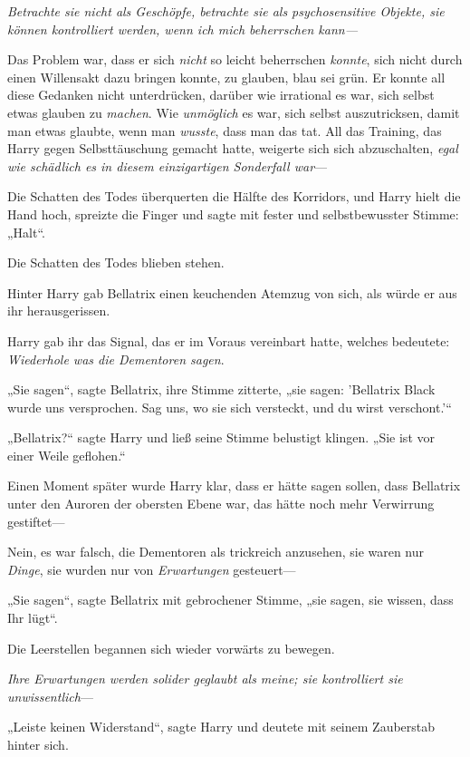 {\emph{Betrachte sie nicht als Geschöpfe, betrachte sie als psychosensitive Objekte, sie können kontrolliert werden, wenn ich mich beherrschen kann—}

Das Problem war, dass er sich \emph{nicht} so leicht beherrschen \emph{konnte}, sich nicht durch einen Willensakt dazu bringen konnte, zu glauben, blau sei grün. Er konnte all diese Gedanken nicht unterdrücken, darüber wie irrational es war, sich selbst etwas glauben zu \emph{machen}. Wie \emph{unmöglich} es war, sich selbst auszutricksen, damit man etwas glaubte, wenn man \emph{wusste}, dass man das tat. All das Training, das Harry gegen Selbsttäuschung gemacht hatte, weigerte sich sich abzuschalten, \emph{egal wie schädlich es in diesem einzigartigen Sonderfall war}—

Die Schatten des Todes überquerten die Hälfte des Korridors, und Harry hielt die Hand hoch, spreizte die Finger und sagte mit fester und selbstbewusster Stimme: „Halt“.

Die Schatten des Todes blieben stehen.

Hinter Harry gab Bellatrix einen keuchenden Atemzug von sich, als würde er aus ihr herausgerissen.

Harry gab ihr das Signal, das er im Voraus vereinbart hatte, welches bedeutete: \emph{Wiederhole was die Dementoren sagen}.

„Sie sagen“, sagte Bellatrix, ihre Stimme zitterte, „sie sagen: 'Bellatrix Black wurde uns versprochen. Sag uns, wo sie sich versteckt, und du wirst verschont.'“

„Bellatrix?“ sagte Harry und ließ seine Stimme belustigt klingen. „Sie ist vor einer Weile geflohen.“

Einen Moment später wurde Harry klar, dass er hätte sagen sollen, dass Bellatrix unter den Auroren der obersten Ebene war, das hätte noch mehr Verwirrung gestiftet—

Nein, es war falsch, die Dementoren als trickreich anzusehen, sie waren nur \emph{Dinge}, sie wurden nur von \emph{Erwartungen} gesteuert—

„Sie sagen“, sagte Bellatrix mit gebrochener Stimme, „sie sagen, sie wissen, dass Ihr lügt“.

Die Leerstellen begannen sich wieder vorwärts zu bewegen.

\emph{Ihre Erwartungen werden solider geglaubt als meine; sie kontrolliert sie unwissentlich}—

„Leiste keinen Widerstand“, sagte Harry und deutete mit seinem Zauberstab hinter sich.

}
